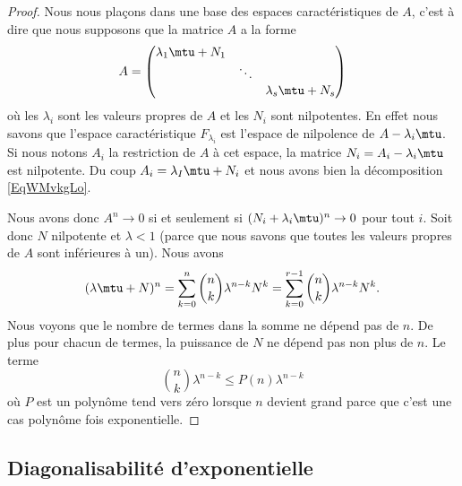 \begin{proof}
    Nous nous plaçons dans une base des espaces caractéristiques de \( A\), c'est à dire que nous supposons que la matrice \( A\) a la forme
    \begin{equation}        \label{EqWMvkgLo}
        A=\begin{pmatrix}
            \lambda_1\mtu+N_1    &       &       \\
                &   \ddots    &       \\
                &       &   \lambda_s\mtu+N_s
        \end{pmatrix}
    \end{equation}
    où les \( \lambda_i\) sont les valeurs propres de \( A\) et les \( N_i\) sont nilpotentes. En effet nous savons que l'espace caractéristique \( F_{\lambda_i}\) est l'espace de nilpolence de \( A-\lambda_i\mtu\). Si nous notons \( A_i\) la restriction de \( A\) à cet espace, la matrice \( N_i=A_i-\lambda_i\mtu\) est nilpotente. Du coup \( A_i=\lambda_I\mtu+N_i\) et nous avons bien la décomposition \eqref{EqWMvkgLo}.

    Nous avons donc \( A^n\to 0\) si et seulement si \( (N_i+\lambda_i\mtu)^n\to 0\) pour tout \( i\). Soit donc \( N\) nilpotente et \( \lambda<1\) (parce que nous savons que toutes les valeurs propres de \( A\) sont inférieures à un). Nous avons
    \begin{equation}
            (\lambda\mtu+N)^n=\sum_{k=0}^n\binom{ n }{ k }\lambda^{n-k}N^{k}
            =\sum_{k=0}^{r-1}\binom{ n }{ k }\lambda^{n-k}N^{k}.
    \end{equation}
    Nous voyons que le nombre de termes dans la somme ne dépend pas de \( n\). De plus pour chacun de termes, la puissance de \( N\) ne dépend pas non plus de \( n\). Le terme
    \begin{equation}
        \binom{ n }{ k }\lambda^{n-k}\leq P(n)\lambda^{n-k}
    \end{equation}
    où \( P\) est un polynôme tend vers zéro lorsque \( n\) devient grand parce que c'est une cas polynôme fois exponentielle.
\end{proof}

\subsection{Diagonalisabilité d'exponentielle}

